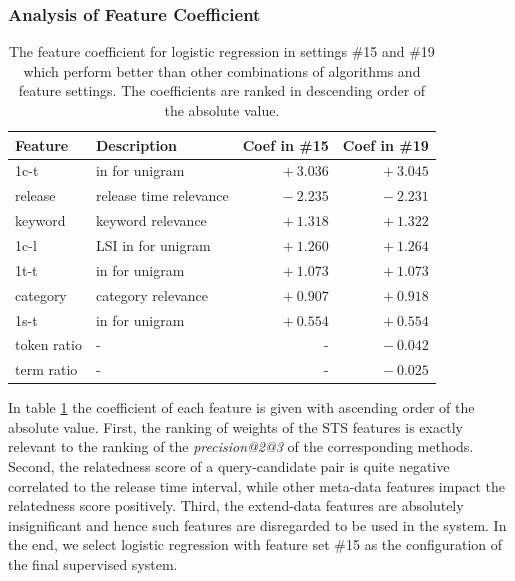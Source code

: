 \subsubsection{Analysis of Feature Coefficient}

\begin{table}[!hbt]
\centering
\begin{tabularx}{0.8\textwidth}{lXrr}
\textbf{Feature} & \textbf{Description}  & \textbf{Coef in \#15} & \textbf{Coef in \#19} \\ \hline
1c-t & \tfidf{} in \icontent{} for unigram     & $+~3.036$  & $+~3.045$     \\
release & release time relevance & $-~2.235$   &  $-~2.231$     \\
keyword & keyword relevance  & $+~1.318$  & $+~1.322$ \\
1c-l & LSI in \icontent{} for unigram     & $+~1.260$   & $+~1.264$    \\
1t-t & \tfidf{} in \ititle{} for unigram     & $+~1.073$   & $+~1.073$      \\
category & category relevance & $+~0.907$   & $+~0.918$     \\
1s-t & \tfidf{} in \isummary{} for unigram      & $+~0.554$   & $~+0.554$     \\ \hline
token ratio & - & - & $-~0.042$ \\ 
term ratio & - & - & $-~0.025$ \\ \hline
\end{tabularx}
\caption[The feature coefficients for logistic regression in settings \#15 and \#19 which perform better than other combinations of algorithms and feature settings]{The feature coefficient for logistic regression in settings \#15 and \#19 which perform better than other combinations of algorithms and feature settings. The coefficients are ranked in descending order of the absolute value. }
\label{tab:coef}
\end{table}

In table \ref{tab:coef} the coefficient of each feature is given with ascending order of the absolute value. First, the ranking of weights of the STS features is exactly relevant to the ranking of the \textit{precision@2@3} of the corresponding methods. Second, the relatedness score of a query-candidate pair is quite negative correlated to the release time interval, while other meta-data features impact the relatedness score positively. Third, the extend-data features are absolutely insignificant and hence such features are disregarded to be used in the system. In the end, we select logistic regression with feature set \#15 as the configuration of the final supervised system. 




